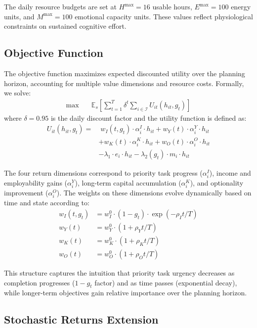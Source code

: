 \documentclass[preprint,review,11pt]{elsarticle}
\newcommand{\E}{\mathbb{E}}
\begin{document}
The daily resource budgets are set at $H^{\max} = 16$ usable hours, $E^{\max} = 100$ energy units, and $M^{\max} = 100$ emotional capacity units. These values reflect physiological constraints on sustained cognitive effort.

\subsection{Objective Function}

The objective function maximizes expected discounted utility over the planning horizon, accounting for multiple value dimensions and resource costs. Formally, we solve:
\begin{align}
\max \quad & \E_s \left[ \sum_{t=1}^T \delta^t \sum_{i \in \mathcal{I}} U_{it}(h_{it}, g_t) \right]
\end{align}
where $\delta = 0.95$ is the daily discount factor and the utility function is defined as:
\begin{align}
U_{it}(h_{it}, g_t) = &\; w_I(t, g_t) \cdot \alpha_i^I \cdot h_{it} + w_Y(t) \cdot \alpha_i^Y \cdot h_{it} \nonumber \\
&+ w_K(t) \cdot \alpha_i^K \cdot h_{it} + w_O(t) \cdot \alpha_i^O \cdot h_{it} \nonumber \\
&- \lambda_1 \cdot e_i \cdot h_{it} - \lambda_2(g_t) \cdot m_i \cdot h_{it}
\end{align}

The four return dimensions correspond to priority task progress ($\alpha_i^I$), income and employability gains ($\alpha_i^Y$), long-term capital accumulation ($\alpha_i^K$), and optionality improvement ($\alpha_i^O$). The weights on these dimensions evolve dynamically based on time and state according to:
\begin{align}
w_I(t, g_t) &= w_I^0 \cdot (1 - g_t) \cdot \exp(-\rho_I t/T) \\
w_Y(t) &= w_Y^0 \cdot (1 + \rho_Y t/T) \\
w_K(t) &= w_K^0 \cdot (1 + \rho_K t/T) \\
w_O(t) &= w_O^0 \cdot (1 + \rho_O t/T)
\end{align}

This structure captures the intuition that priority task urgency decreases as completion progresses ($1 - g_t$ factor) and as time passes (exponential decay), while longer-term objectives gain relative importance over the planning horizon.

\subsection{Stochastic Returns Extension}
\end{document}

